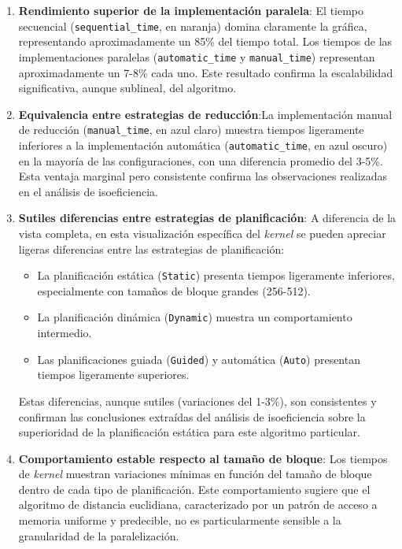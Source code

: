         \begin{enumerate}
        
            \item \textbf{Rendimiento superior de la implementación paralela}: El tiempo secuencial (\texttt{sequential\_time}, en naranja) domina claramente la gráfica, representando aproximadamente un 85\% del tiempo total. Los tiempos de las implementaciones paralelas (\texttt{automatic\_time} y \texttt{manual\_time}) representan aproximadamente un 7-8\% cada uno. Este resultado confirma la escalabilidad significativa, aunque sublineal, del algoritmo.
            
            \item \textbf{Equivalencia entre estrategias de reducción}:La implementación manual de reducción (\texttt{manual\_time}, en azul claro) muestra tiempos ligeramente inferiores a la implementación automática (\texttt{automatic\_time}, en azul oscuro) en la mayoría de las configuraciones, con una diferencia promedio del 3-5\%. Esta ventaja marginal pero consistente confirma las observaciones realizadas en el análisis de isoeficiencia.
            
            \item \textbf{Sutiles diferencias entre estrategias de planificación}: A diferencia de la vista completa, en esta visualización específica del \textit{kernel} se pueden apreciar ligeras diferencias entre las estrategias de planificación:
    
            \begin{itemize}
            
                \item La planificación estática (\texttt{Static}) presenta tiempos ligeramente inferiores, especialmente con tamaños de bloque grandes (256-512).
                
                \item La planificación dinámica (\texttt{Dynamic}) muestra un comportamiento intermedio.
                
                \item Las planificaciones guiada (\texttt{Guided}) y automática (\texttt{Auto}) presentan tiempos ligeramente superiores.
                
            \end{itemize}
            
            Estas diferencias, aunque sutiles (variaciones del 1-3\%), son consistentes y confirman las conclusiones extraídas del análisis de isoeficiencia sobre la superioridad de la planificación estática para este algoritmo particular.
    
            \item \textbf{Comportamiento estable respecto al tamaño de bloque}: Los tiempos de \textit{kernel} muestran variaciones mínimas en función del tamaño de bloque dentro de cada tipo de planificación. Este comportamiento sugiere que el algoritmo de distancia euclidiana, caracterizado por un patrón de acceso a memoria uniforme y predecible, no es particularmente sensible a la granularidad de la paralelización.
    
        \end{enumerate}
    

